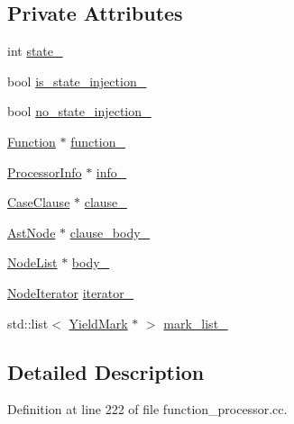 \subsection*{Private Attributes}
\begin{DoxyCompactItemize}
\item 
int \hyperlink{classmocha_1_1_yield_helper_af18a7f0c42d4d40e975c10cdd79aa0ad}{state\_\-}
\item 
bool \hyperlink{classmocha_1_1_yield_helper_a536e157628045d35cf7cf3edb0199e85}{is\_\-state\_\-injection\_\-}
\item 
bool \hyperlink{classmocha_1_1_yield_helper_a454e09b29dc21bcbb4779db83a053a60}{no\_\-state\_\-injection\_\-}
\item 
\hyperlink{classmocha_1_1_function}{Function} $\ast$ \hyperlink{classmocha_1_1_yield_helper_a9e99c357f655aabff5f38121dfb08d18}{function\_\-}
\item 
\hyperlink{classmocha_1_1_processor_info}{ProcessorInfo} $\ast$ \hyperlink{classmocha_1_1_yield_helper_ac8e17b43697ddf37d4b013f517d37e0d}{info\_\-}
\item 
\hyperlink{classmocha_1_1_case_clause}{CaseClause} $\ast$ \hyperlink{classmocha_1_1_yield_helper_a9247061d7e154c260d9ded8353721a65}{clause\_\-}
\item 
\hyperlink{classmocha_1_1_ast_node}{AstNode} $\ast$ \hyperlink{classmocha_1_1_yield_helper_a046274df2eacd4e17ad512cd6326b33a}{clause\_\-body\_\-}
\item 
\hyperlink{classmocha_1_1_node_list}{NodeList} $\ast$ \hyperlink{classmocha_1_1_yield_helper_a7d77b54310e328fcffe9fb3a5d9da25f}{body\_\-}
\item 
\hyperlink{classmocha_1_1_node_iterator}{NodeIterator} \hyperlink{classmocha_1_1_yield_helper_acf3b4f7c427390d530ec386bdbf0aed5}{iterator\_\-}
\item 
std::list$<$ \hyperlink{classmocha_1_1_yield_mark}{YieldMark} $\ast$ $>$ \hyperlink{classmocha_1_1_yield_helper_ae6fd6bf0b97adb5f599b59585498d626}{mark\_\-list\_\-}
\end{DoxyCompactItemize}


\subsection{Detailed Description}


Definition at line 222 of file function\_\-processor.cc.



